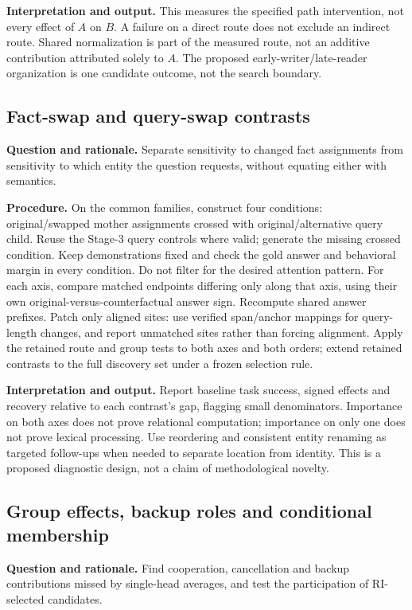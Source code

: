 \documentclass[11pt,a4paper]{article}
\newcommand{\purpose}{\textbf{Question and rationale.} }
\newcommand{\procedure}{\textbf{Procedure.} }
\newcommand{\interpretation}{\textbf{Interpretation and output.} }
\begin{document}
\interpretation This measures the specified path intervention, not every
effect of $A$ on $B$. A failure on a direct route does not exclude an indirect
route. Shared normalization is part of the measured route, not an additive
contribution attributed solely to $A$. The proposed early-writer/late-reader
organization is one candidate outcome, not the search boundary.

\subsection{Fact-swap and query-swap contrasts}
\purpose Separate sensitivity to changed fact assignments from sensitivity
to which entity the question requests, without equating either with semantics.

\procedure On the common families, construct four conditions: original/swapped
mother assignments crossed with original/alternative query child. Reuse the
Stage-3 query controls where valid; generate the missing crossed condition.
Keep demonstrations fixed and check the gold answer and behavioral margin in
every condition. Do not filter for the desired attention pattern.
For each axis, compare matched endpoints differing only along that axis, using
their own original-versus-counterfactual answer sign. Recompute shared answer
prefixes. Patch only aligned sites: use verified span/anchor mappings for
query-length changes, and report unmatched sites rather than forcing alignment.
Apply the retained route and group tests to both axes and both orders; extend
retained contrasts to the full discovery set under a frozen selection rule.

\interpretation Report baseline task success, signed effects and recovery
relative to each contrast's gap, flagging small denominators. Importance on both
axes does not prove relational computation; importance on only one does not
prove lexical processing. Use reordering and consistent entity renaming as
targeted follow-ups when needed to separate location from identity. This is a
proposed diagnostic design, not a claim of methodological novelty.

\subsection{Group effects, backup roles and conditional membership}
\purpose Find cooperation, cancellation and backup contributions missed by
single-head averages, and test the participation of RI-selected candidates.
\end{document}

